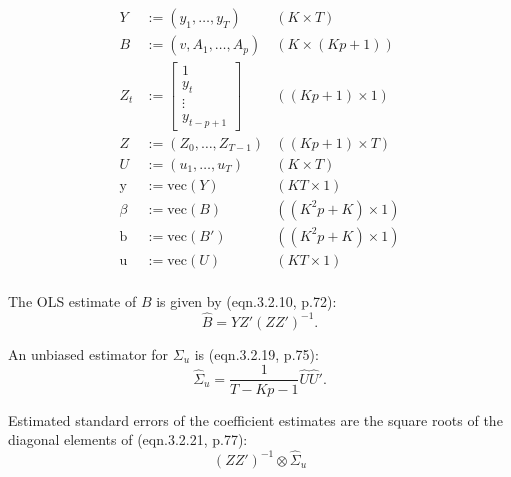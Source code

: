 \documentclass[12pt]{article}
\begin{document}
\begin{align*}
	Y   & :=  (y_1, \dots, y_T)      & (K \times T)        \\
	B   & :=    (v, A_1, \dots, A_p) & (K \times (Kp + 1)) \\
	Z_t & :=  	\left[ \begin{array}{c}
		    1     \\
		   y_t    \\
		 \vdots   \\
		y_{t-p+1}
	\end{array} \right]                       & ((Kp + 1) \times 1) \\
	Z & := (Z_0, \dots, Z_{T-1}) & ((Kp + 1) \times T) \\
	U   & :=  (u_1, \dots, u_T)      & (K \times T)        \\
	\mathrm{y} & := \mathrm{vec}(Y) & (KT \times 1) \\
	\beta  & := \mathrm{vec}(B) & ((K^2p + K) \times 1) \\
	\mathrm{b} & := \mathrm{vec}(B') & ((K^2p + K) \times 1) \\
	\mathrm{u} & := \mathrm{vec}(U)  & (KT \times 1) \\
\end{align*}

The OLS estimate of $ B $ is given by (eqn.3.2.10, p.72):
\[
	\widehat{B} = Y Z' (Z Z')^{-1}.
\]

An unbiased estimator for $ \Sigma_u $ is (eqn.3.2.19, p.75):
\[
	\widehat{\Sigma}_u = \frac{1}{T - Kp - 1} \widehat{U} \widehat{U}'.
\]

Estimated standard errors of the coefficient estimates are the square roots of the diagonal elements of (eqn.3.2.21, p.77):
\[
	(Z Z')^{-1} \otimes \widehat{\Sigma}_u
\]
\end{document}
